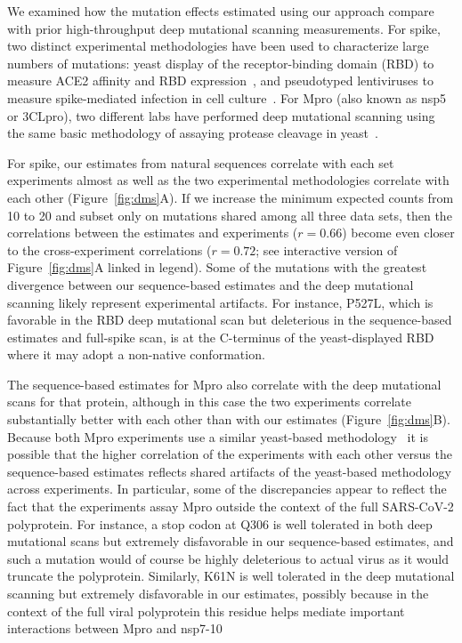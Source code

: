 \documentclass[9pt,twocolumn,twoside]{gsajnl_modified}
\begin{document}
We examined how the mutation effects estimated using our approach compare with prior high-throughput deep mutational scanning measurements.
For spike, two distinct experimental methodologies have been used to characterize large numbers of mutations: yeast display of the receptor-binding domain (RBD) to measure ACE2 affinity and RBD expression~\citep{starr2020deep,starr2022deep}, and pseudotyped lentiviruses to measure spike-mediated infection in cell culture~\citep{dadonaite2022pseudovirus}.
For Mpro (also known as nsp5 or 3CLpro), two different labs have performed deep mutational scanning using the same basic methodology of assaying protease cleavage in yeast~\citep{flynn2022,iketani2022functional}.

For spike, our estimates from natural sequences correlate with each set experiments almost as well as the two experimental methodologies correlate with each other (Figure~\ref{fig:dms}A).
If we increase the minimum expected counts from 10 to 20 and subset only on mutations shared among all three data sets, then the correlations between the estimates and experiments ($r = 0.66$) become even closer to the cross-experiment correlations ($r = 0.72$; see interactive version of Figure~\ref{fig:dms}A linked in legend).
Some of the mutations with the greatest divergence between our sequence-based estimates and the deep mutational scanning likely represent experimental artifacts.
For instance, P527L, which is favorable in the RBD deep mutational scan but deleterious in the sequence-based estimates and full-spike scan, is at the C-terminus of the yeast-displayed RBD~\citep{starr2020deep} where it may adopt a non-native conformation.

The sequence-based estimates for Mpro also correlate with the deep mutational scans for that protein, although in this case the two experiments correlate substantially better with each other than with our estimates (Figure~\ref{fig:dms}B).
Because both Mpro experiments use a similar yeast-based methodology~\citep{flynn2022,iketani2022functional} it is possible that the higher correlation of the experiments with each other versus the sequence-based estimates reflects shared artifacts of the yeast-based methodology across experiments.
In particular, some of the discrepancies appear to reflect the fact that the experiments assay Mpro outside the context of the full SARS-CoV-2 polyprotein.
For instance, a stop codon at Q306 is well tolerated in both deep mutational scans but extremely disfavorable in our sequence-based estimates, and such a mutation would of course be highly deleterious to actual virus as it would truncate the polyprotein.
Similarly, K61N is well tolerated in the deep mutational scanning but extremely disfavorable in our estimates, possibly because in the context of the full viral polyprotein this residue helps mediate important interactions between Mpro and nsp7-10~\citep{yadav2022biochemical}
\end{document}
